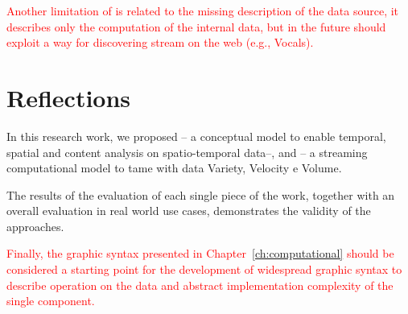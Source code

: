 \textcolor{red}{Another limitation of \river{} is related to the missing description of the data source, it describes only the computation of the internal data, but in the future \river{} should exploit a way for discovering stream on the web (e.g., Vocals).}

\section{Reflections}
In this research work, we proposed \frappe{} -- a conceptual model to enable temporal, spatial and content analysis on spatio-temporal data--, and \river{} -- a streaming computational model to tame with data Variety, Velocity e Volume.

The results of the evaluation of each single piece of the work, together with an overall evaluation in real world use cases, demonstrates the validity of the approaches.

\textcolor{red}{Finally, the graphic syntax presented in Chapter~\ref{ch:computational} should be considered a starting point for the development of widespread graphic syntax to describe operation on the data and abstract implementation complexity of the single component.}


